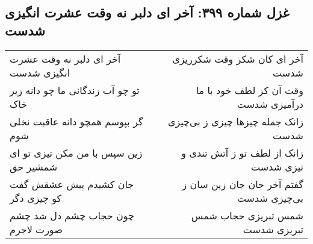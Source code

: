 \begin{center}
\section*{غزل شماره ۳۹۹: آخر ای دلبر نه وقت عشرت انگیزی شدست}
\label{sec:0399}
\begin{longtable}{l p{0.5cm} r}
آخر ای دلبر نه وقت عشرت انگیزی شدست
&&
آخر ای کان شکر وقت شکرریزی شدست
\\
تو چو آب زندگانی ما چو دانه زیر خاک
&&
وقت آن کز لطف خود با ما درآمیزی شدست
\\
گر بپوسم همچو دانه عاقبت نخلی شوم
&&
زانک جمله چیزها چیزی ز بی‌چیزی شدست
\\
زین سپس با من مکن تیزی تو ای شمشیر حق
&&
زانک از لطف تو ز آتش تندی و تیزی شدست
\\
جان کشیدم پیش عشقش گفت کو چیزی دگر
&&
گفتم آخر جان جان زین سان ز بی‌چیزی شدست
\\
چون حجاب چشم دل شد چشم صورت لاجرم
&&
شمس تبریزی حجاب شمس تبریزی شدست
\\
\end{longtable}
\end{center}
